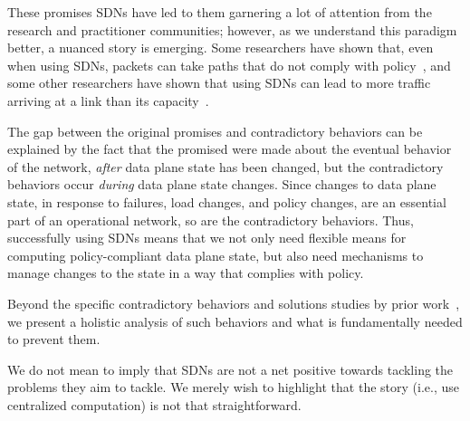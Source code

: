 These promises SDNs have led to them garnering a lot of attention from the research and practitioner communities; however, as we understand this paradigm better, a nuanced story is emerging.  Some researchers have shown that, even when using SDNs, packets can take paths that do not comply with policy~\cite{safeupdate,xx}, and some other researchers have shown that using SDNs can lead to more traffic arriving at a link than its capacity~\cite{swan}.

The gap between the original promises and contradictory behaviors can be explained by the fact that the promised were made about the eventual behavior of the network, {\em after} data plane state has been changed, but the contradictory behaviors occur {\em during} data plane state changes. Since changes to data plane state, in response to failures, load changes, and policy changes, are an essential part of an operational network, so are the contradictory behaviors. Thus, successfully using SDNs means that we not only need flexible means for computing policy-compliant data plane state,  but also need mechanisms to manage changes to the state in a way that complies with policy.

Beyond the specific contradictory behaviors and solutions studies by prior work~\cite{safeupdate,swan}, we present a holistic analysis of such behaviors and what is fundamentally needed to prevent them.

We do not mean to imply that SDNs are not a net positive towards tackling the problems they aim to tackle. We merely wish to highlight that the story (i.e., use centralized computation) is not that straightforward. 
